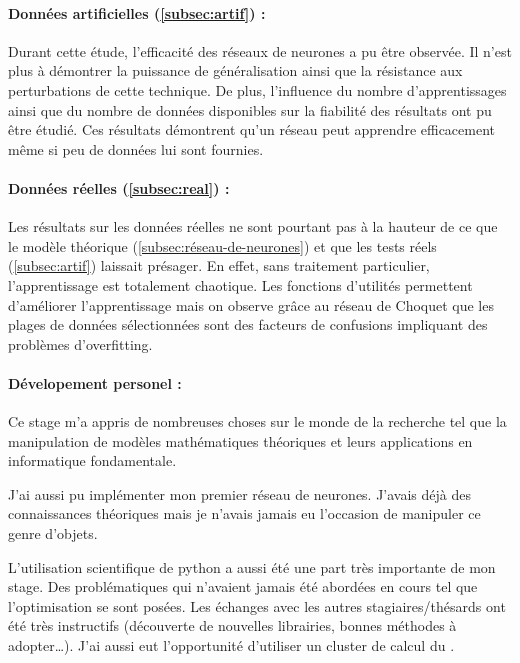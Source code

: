 

\paragraph{Données artificielles (\ref{subsec:artif}) :\\}
Durant cette étude, l'efficacité des réseaux de neurones a pu être observée.
Il n'est plus à démontrer la puissance de généralisation ainsi que la résistance aux perturbations de cette technique.
De plus, l'influence du nombre d'apprentissages ainsi que du nombre de données disponibles sur la fiabilité des résultats ont pu être étudié.
Ces résultats démontrent qu'un réseau peut apprendre efficacement même si peu de données lui sont fournies.



\paragraph{Données réelles (\ref{subsec:real}) :\\}
Les résultats sur les données réelles ne sont pourtant pas à la hauteur
de ce que le modèle théorique (\ref{subsec:réseau-de-neurones})
et que les tests réels (\ref{subsec:artif}) laissait présager.
En effet, sans traitement particulier, l'apprentissage est totalement chaotique.
Les fonctions d'utilités permettent d'améliorer l'apprentissage mais
on observe grâce au réseau de Choquet que les plages de données sélectionnées
sont des facteurs de confusions impliquant des problèmes d'overfitting.


\paragraph{Dévelopement personel :\\}
Ce stage m'a appris de nombreuses choses sur le monde de la recherche tel
que la manipulation de modèles mathématiques théoriques et leurs applications
en informatique fondamentale.


J'ai aussi pu implémenter mon premier réseau de neurones.
J'avais déjà des connaissances théoriques mais je
n'avais jamais eu l'occasion de manipuler ce genre d'objets.


L'utilisation scientifique de python a aussi été une part très importante de mon stage.
Des problématiques qui n'avaient jamais été abordées en cours tel que l'optimisation se sont posées.
Les échanges avec les autres stagiaires/thésards ont été très instructifs
(découverte de nouvelles librairies, bonnes méthodes à adopter\ldots).
J'ai aussi eut l'opportunité d'utiliser un cluster de calcul du \lri.


